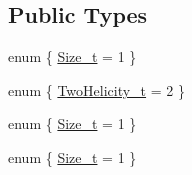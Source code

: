 \subsection*{Public Types}
\begin{DoxyCompactItemize}
\item 
enum \{ \mbox{\hyperlink{structHadron_1_1H1D2B2Rep_afe5f894aacd7714a5528f2fbf045c20da6c9094c64756bb3996b1e4df4e5664ca}{Size\+\_\+t}} = 1
 \}
\item 
enum \{ \mbox{\hyperlink{structHadron_1_1H1D2B2Rep_a20531716be32837bf94cd77e9e777d60a2a9c08b21871c2099a8143231d78e313}{Two\+Helicity\+\_\+t}} = 2
 \}
\item 
enum \{ \mbox{\hyperlink{structHadron_1_1H1D2B2Rep_afe5f894aacd7714a5528f2fbf045c20da6c9094c64756bb3996b1e4df4e5664ca}{Size\+\_\+t}} = 1
 \}
\item 
enum \{ \mbox{\hyperlink{structHadron_1_1H1D2B2Rep_afe5f894aacd7714a5528f2fbf045c20da6c9094c64756bb3996b1e4df4e5664ca}{Size\+\_\+t}} = 1
 \}
\end{DoxyCompactItemize}
